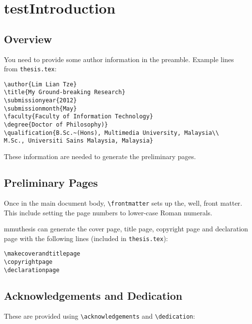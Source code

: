 \chapter{testIntroduction}


\section{Overview}\label{sec:overview:info}
You need to provide some author information in the preamble. Example lines from \texttt{thesis.tex}:

\medskip

\begin{lstlisting}[moretexcs={submissionyear,submissionmonth,faculty,degree,qualification}]
\author{Lim Lian Tze}
\title{My Ground-breaking Research}
\submissionyear{2012}
\submissionmonth{May}
\faculty{Faculty of Information Technology}
\degree{Doctor of Philosophy)}
\qualification{B.Sc.~(Hons), Multimedia University, Malaysia\\
M.Sc., Universiti Sains Malaysia, Malaysia}
\end{lstlisting}

\medskip

These information are needed to generate the preliminary pages.


\section{Preliminary Pages}\label{sec:prelim:pages}
Once in the main document body, \lstinline[moretexcs={frontmatter}]|\frontmatter| sets up the, well, front matter. This include setting the page numbers to lower-case Roman numerals.

\textsf{mmuthesis} can generate the cover page, title page, copyright page and declaration page with the following lines (included in \texttt{thesis.tex}):

\medskip

\begin{lstlisting}[moretexcs={makecoverandtitlepage,copyrightpage,declarationpage}]
\makecoverandtitlepage
\copyrightpage
\declarationpage
\end{lstlisting}

\section{Acknowledgements and Dedication}\label{sec:acknowledge:dedication}
These are provided using \lstinline|\acknowledgements| and \lstinline|\dedication|:

